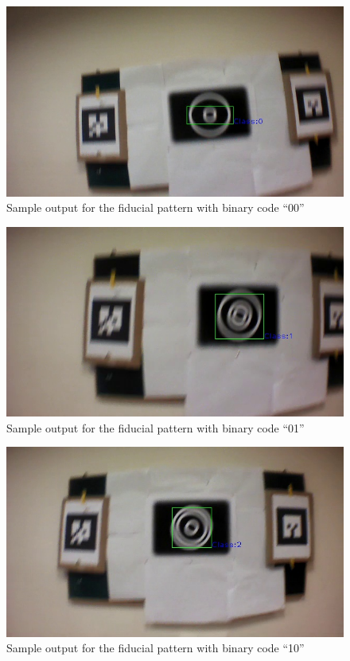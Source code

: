 \documentclass[runningheads]{llncs}
\begin{document}
\begin{figure}
\centering
  \includegraphics[width=.8\linewidth]{output_00.jpg}
  \caption{Sample output for the fiducial pattern with binary code ``00''}
  \label{fig:output0}
\end{figure}

\begin{figure}
\centering
  \includegraphics[width=.8\linewidth]{output_01.jpg}
  \caption{Sample output for the fiducial pattern with binary code ``01''}
  \label{fig:output1}
\end{figure}

\begin{figure}
\centering
  \includegraphics[width=.8\linewidth]{output_10.jpg}
  \caption{Sample output for the fiducial pattern with binary code ``10''}
  \label{fig:output2}
\end{figure}
\end{document}
